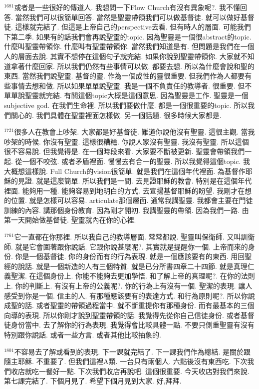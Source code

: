 \documentclass{book}
\begin{document}
$^{1681}$或者是一些很好的傳道人.
我想問一下Flow Church有沒有異象呢?.
我不懂回答.
當然我們可以很簡單回答.
當然是聖靈帶領我們可以做基督徒.
就可以做好基督徒.
這樣就完結了.
但這是上帝自己的perspective去看.
但有時人的層面.
可能我們下第二季.
如果有的話我們會再說聖靈的topic.
因為聖靈是一個很abstract的topic.
什麼叫聖靈帶領你.
什麼叫有聖靈帶領你.
當然我們知道是有.
但問題是我們在一個人的層面去說.
其實不想停在這個句子就完結.
如果你說到聖靈帶領你.
大家就不知道拿著什麼回家.
所以我們仍然有些事情可以做.
都要去想.
所以為什麼會說和聖的東西.
當然我們說聖靈.
基督的靈.
作為一個成性的靈很重要.
但我們作為人都要有些事情去想和做.
所以如果單單說聖靈.
我是一個不負責任的教導者.
很重要.
但不單單說聖靈就完結.
有關這個topic大概是這個意思.
因為聖靈是工作.
聖靈是一個subjective god.
在我們生命裡.
所以我們要做什麼.
都是一個很重要的topic.
所以我們關心的.
我們具體在聖靈裡面怎樣做.
另一個話題.
很多時候大家都是.

$^{1721}$很多人在教會上吵架.
大家都是好基督徒.
難道你說他沒有聖靈.
這很主觀.
當我吵架的時候.
你沒有聖靈.
這樣很糟糕.
你說人家沒有聖靈.
我沒有聖靈.
所以這個很不容易說.
但我覺得是.
在一個時段來看.
大家要不斷被更新.
聖靈會帶領我們一起.
從一個不咬弦.
或者矛盾裡面.
慢慢去有合一的聖靈.
所以我覺得這個topic.
我大概想這樣說.
Full Church的vision很簡單.
就是我們在這個年代裡面.
為基督作耶穌的見證.
就是這麼簡單.
所以我們是一間.
去見證耶穌的教會.
特別是在這個年代裡面.
能夠用一種.
能夠容易到地明白的方式.
去宣揚基督耶穌的盼望.
我剛才在想的位置.
就是怎樣可以容易.
articulate那個層面.
通常我講聖靈.
我都會主要在門徒訓練的內容.
講那個身份教育.
因為剛才開初.
我講聖靈的帶領.
因為我們一路.
由第一天開始做基督徒.
聖靈就內在你的心裡.

$^{1761}$它一直都在你那裡.
所以我自己的教導層面.
常常都說.
聖靈叫保衛師.
又叫訓衛師.
就是它會圍著跟你說話.
它跟你說甚麼呢?.
其實就是提醒你一個.
上帝而來的身份.
你是一個基督徒.
你的身份而有的行為表現.
就是一個應該要有的東西.
用回聖經的說話.
就是一個新造的人有三個特質.
就是已分所書四章二十四節.
就是真理仁義聖潔.
在這個身份上.
你能不能夠去更加學悟.
和了解上帝的真理呢?.
在你的法則上.
你的判斷上.
有沒有上帝的公義呢?.
你的行為上有沒有一個.
聖潔的表現.
讓人感受到你是一個.
信主的人.
有那種應該要有的表達方式.
和行為原則呢?.
所以你說成聖的話.
或者聖靈的帶領過程當中.
就不斷重提你有那種身份.
而有最基本的三個向導的表現.
所以你剛才說到聖靈帶領的話.
我覺得先從你自己信徒身份.
或者基督徒身份當中.
去了解你的行為表現.
我覺得會比較具體一點.
不要只側重聖靈有沒有特別跟你說話.
或者一些方言.
或者其他比較抽象的.

$^{1801}$不容易去了解或看到的表現.
下一課就完結了.
下一課我們作為總結.
是關於跟隨主耶穌.
不重要了.
但我們這裡A類.
一台只有兩個人.
六點後沒有東西吃.
下次我們收店就吃一餐好一點.
下次我們收店再說吧.
這個很重要.
今天收店對我們來說.
第七課完結了.
下個月見了.
希望下個月見到大家.
好,拜拜.
\newpage
\end{document}
